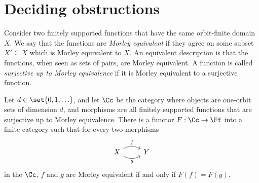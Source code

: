 
\section{Deciding obstructions}
\label{sec:deciding-obstructions}

Consider two finitely supported functions that have the same orbit-finite domain $X$. We say that the functions are  \emph{Morley equivalent} if they agree on  some subset $X' \subseteq X$ which is Morley equivalent to $X$. An equivalent description is that the functions, when seen as sets of pairs, are Morley equivalent.  A function is called \emph{surjective up to Morley equivalence} if it is Morley equivalent to a surjective function.

\begin{lemma}
    Let $d \in \set{0,1,\ldots}$, and let $\Cc$ be the category where objects are one-orbit sets of dimension $d$, and morphisms are  all finitely supported functions that are surjective up to Morley equivalence. There is a functor $F : \Cc \to \Ff$ into a finite category such that for  every two morphisms 
    \[
    \begin{tikzcd}
    X \arrow[r,"f",bend left] \arrow[r,"g"', bend right] & Y 
    \end{tikzcd}
    \]
    in the $\Cc$, 
    $f$ and $g$  are Morley equivalent if and only if  $F(f) = F(g)$. \end{lemma}
